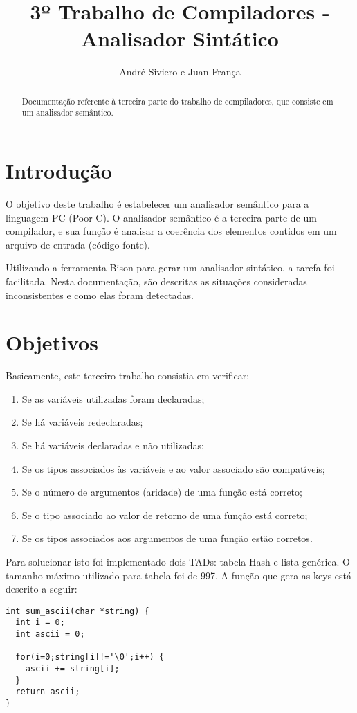 \documentclass[a4paper,10pt]{article}
\title{3º Trabalho de Compiladores - Analisador Sintático}
\author{André Siviero e Juan França}
\begin{document}
\maketitle

\begin{abstract}
Documentação referente à terceira parte do trabalho de compiladores, que consiste em um analisador semântico.
\end{abstract}

\section{Introdução}
O objetivo deste trabalho é estabelecer um analisador semântico para a linguagem PC (Poor C). O analisador semântico é a terceira parte de um compilador,
e sua função é analisar a coerência dos elementos contidos em um arquivo de entrada (código fonte). 

Utilizando a ferramenta Bison para gerar um analisador sintático, a tarefa foi facilitada. Nesta documentação, são descritas as situações consideradas inconsistentes e como elas foram detectadas.

\section{Objetivos}
Basicamente, este terceiro trabalho consistia em verificar:
\begin{enumerate}
\item Se as variáveis utilizadas foram declaradas;
\item Se há variáveis redeclaradas;
\item Se há variáveis declaradas e não utilizadas;
\item Se os tipos associados às variáveis e ao valor associado são compatíveis;
\item Se o número de argumentos (aridade) de uma função está correto;
\item Se o tipo associado ao valor de retorno de uma função está correto;
\item Se os tipos associados aos argumentos de uma função estão corretos.
\end{enumerate}

Para solucionar isto foi implementado dois TADs: tabela Hash e lista genérica. O tamanho máximo utilizado para tabela foi de 997. A função que gera as keys está descrito a seguir:

\begin{lstlisting}
int sum_ascii(char *string) {
  int i = 0;
  int ascii = 0;

  for(i=0;string[i]!='\0';i++) {
    ascii += string[i];
  }
  return ascii;
}
\end{lstlisting}
\end{document}
